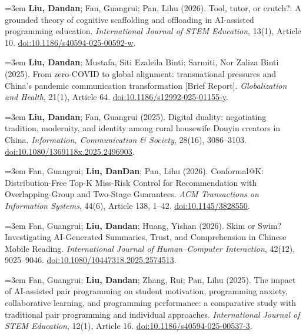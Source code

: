 \documentclass[a4paper,11pt]{article}
\newcommand{\publication}[2]{%
  \par\addvspace{8pt}\noindent
  \begin{minipage}{\linewidth}
    \linespread{1.06}\fontsize{10.8}{13.4}\selectfont\raggedright
    \hangindent=3em\hangafter=1
    \makebox[3em][l]{\textcolor{teal}{[#1]}}#2
  \end{minipage}\par}
\begin{document}
\publication{J4}{\textbf{Liu, Dandan}; Fan, Guangrui; Pan, Lihu (2026). Tool, tutor, or crutch?: A grounded theory of cognitive scaffolding and offloading in AI-assisted programming education. \emph{International Journal of STEM Education}, 13(1), Article 10. \href{https://doi.org/10.1186/s40594-025-00592-w}{doi:10.1186/s40594-025-00592-w}.}

\publication{J5}{\textbf{Liu, Dandan}; Mustafa, Siti Ezaleila Binti; Sarmiti, Nor Zaliza Binti (2025). From zero-COVID to global alignment: transnational pressures and China's pandemic communication transformation [Brief Report]. \emph{Globalization and Health}, 21(1), Article 64. \href{https://doi.org/10.1186/s12992-025-01155-y}{doi:10.1186/s12992-025-01155-y}.}

\publication{J6}{\textbf{Liu, Dandan}; Fan, Guangrui (2025). Digital duality: negotiating tradition, modernity, and identity among rural housewife Douyin creators in China. \emph{Information, Communication \& Society}, 28(16), 3086--3103. \href{https://doi.org/10.1080/1369118x.2025.2496903}{doi:10.1080/1369118x.2025.2496903}.}

\publication{J7}{Fan, Guangrui; \textbf{Liu, DanDan}; Pan, Lihu (2026). Conformal@K: Distribution-Free Top-K Miss-Risk Control for Recommendation with Overlapping-Group and Two-Stage Guarantees. \emph{ACM Transactions on Information Systems}, 44(6), Article 138, 1--42. \href{https://doi.org/10.1145/3828550}{doi:10.1145/3828550}.}

\publication{J8}{Fan, Guangrui; \textbf{Liu, Dandan}; Huang, Yishan (2026). Skim or Swim? Investigating AI-Generated Summaries, Trust, and Comprehension in Chinese Mobile Reading. \emph{International Journal of Human--Computer Interaction}, 42(12), 9025--9046. \href{https://doi.org/10.1080/10447318.2025.2574513}{doi:10.1080/10447318.2025.2574513}.}

\publication{J9}{Fan, Guangrui; \textbf{Liu, Dandan}; Zhang, Rui; Pan, Lihu (2025). The impact of AI-assisted pair programming on student motivation, programming anxiety, collaborative learning, and programming performance: a comparative study with traditional pair programming and individual approaches. \emph{International Journal of STEM Education}, 12(1), Article 16. \href{https://doi.org/10.1186/s40594-025-00537-3}{doi:10.1186/s40594-025-00537-3}.}
\end{document}
